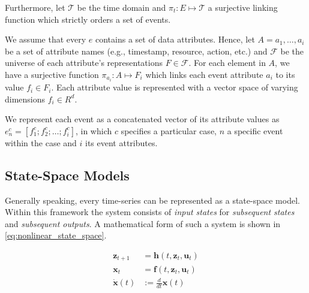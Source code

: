 \documentclass[12pt,a4paper]{report}
\begin{document}
Furthermore, let $\mathcal{T}$ be the time domain and $\pi_t : E \mapsto \mathcal{T}$ a surjective linking function which strictly orders a set of events.

We assume that every $e$ contains a set of data attributes. Hence, let $A = a_1, \ldots, a_i$ be a set of attribute names (e.g., timestamp, resource, action, etc.) and $\mathcal{F}$ be the universe of each attribute's representations $F \in \mathcal{F}$. For each element in $A$, we have a surjective function $\pi_{a_i} : A \mapsto F_i$ which links each event attribute $a_i$ to its value $f_i \in F_i$. Each attribute value is represented with a vector space of varying dimensions $f_i \in R^d$.  

We represent each event as a concatenated vector of its attribute values as $e_n^{c} = [f_1^{c}; f_2^{c}; \ldots; f_i^{c}]$, in which $c$ specifies a particular case, $n$ a specific event within the case and $i$ its event attributes. 



\subsection{State-Space Models}
Generally speaking, every time-series can be represented as a state-space model\autocite{kalman_NewApproachLinear_1960a}. Within this framework the system consists of \emph{input states} for \emph{subsequent states} and \emph{subsequent outputs}. A mathematical form of such a system is shown in \autoref{eq:nonlinear_state_space}.

\begin{align}
    \label{eq:nonlinear_state_space}
    \mathbf{z}_{t+1} & =\mathbf{h}(t, \mathbf{z}_{t}, \mathbf{u}_{t})           \\
    \mathbf{x}_{t}   & =\mathbf{f}(t, \mathbf{z}_{t}, \mathbf{u}_{t}) \nonumber \\
    \dot{\mathbf{x}}(t) &:=\frac{d}{d t} \mathbf{x}(t) \nonumber
\end{align}
\end{document}
